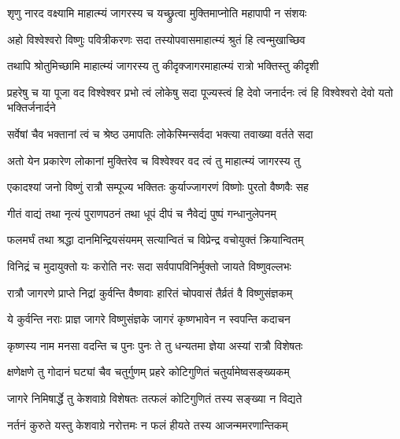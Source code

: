 
\twolineshloka
{शृणु नारद वक्ष्यामि माहात्म्यं जागरस्य च}
{यच्छ्रुत्वा मुक्तिमाप्नोति महापापी न संशयः}%


\twolineshloka
{अहो विश्वेश्वरो विष्णुः पवित्रीकरणः सदा}
{तस्योपवासमाहात्म्यं श्रुतं हि त्वन्मुखाच्छिव}%

\twolineshloka
{तथापि श्रोतुमिच्छामि माहात्म्यं जागरस्य तु }
{कीदृक्जागरमाहात्म्यं रात्रो भक्तिस्तु  कीदृशी}%

\threelineshloka
{प्रहरेषु च या पूजा वद विश्वेश्वर प्रभो}
{त्वं लोकेषु सदा पूज्यस्त्वं हि देवो जनार्दनः}
{त्वं हि विश्वेश्वरो देवो यतो भक्तिर्जनार्दने}%

\twolineshloka
{सर्वेषां चैव भक्तानां त्वं च श्रेष्ठ उमापतिः}
{लोकेस्मिन्सर्वदा भक्त्या तवाख्या वर्तते सदा}%

\twolineshloka
{अतो येन प्रकारेण लोकानां मुक्तिरेव च}
{विश्वेश्वर वद त्वं तु माहात्म्यं जागरस्य तु}%


\twolineshloka
{एकादश्यां जनो विष्णुं रात्रौ सम्पूज्य भक्तितः}
{कुर्याज्जागरणं विष्णोः पुरतो वैष्णवैः सह}%

\twolineshloka
{गीतं वाद्यं तथा नृत्यं पुराणपठनं तथा}
{धूपं दीपं च नैवेद्यं पुष्पं गन्धानुलेपनम्}%

\twolineshloka
{फलमर्घं तथा श्रद्धा दानमिन्द्रियसंयमम्}
{सत्यान्वितं च विप्रेन्द्र वचोयुक्तं क्रियान्वितम्}%

\twolineshloka
{विनिद्रं च मुदायुक्तो यः करोति नरः सदा}
{सर्वपापविनिर्मुक्तो जायते विष्णुवल्लभः}%

\twolineshloka
{रात्रौ जागरणे प्राप्ते निद्रां कुर्वन्ति वैष्णवाः}
{हारितं चोपवासं तैर्व्रतं वै विष्णुसंज्ञकम्}%

\twolineshloka
{ये कुर्वन्ति नराः प्राज्ञ जागरे विष्णुसंज्ञके}
{जागरं कृष्णभावेन न स्वपन्ति कदाचन}%

\twolineshloka
{कृष्णस्य नाम मनसा वदन्ति च पुनः पुनः}
{ते तु धन्यतमा ज्ञेया अस्यां रात्रौ विशेषतः}%

\twolineshloka
{क्षणेक्षणे तु गोदानं घट्यां चैव चतुर्गुणम्}
{प्रहरे कोटिगुणितं चतुर्यामेष्वसङ्ख्यकम्}%

\twolineshloka
{जागरे निमिषार्द्धे तु केशवाग्रे विशेषतः}
{तत्फलं कोटिगुणितं तस्य सङ्ख्या न विद्यते}%

\twolineshloka
{नर्तनं कुरुते यस्तु केशवाग्रे नरोत्तमः}
{न फलं हीयते तस्य आजन्ममरणान्तिकम्}%

